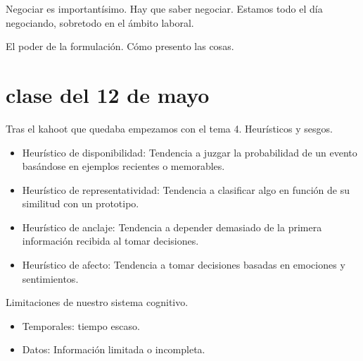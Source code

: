 \documentclass[12pt, a4paper, twoside]{article}
\begin{document}
Negociar es importantísimo. Hay que saber negociar.
Estamos todo el día negociando, sobretodo en el ámbito laboral.

El poder de la formulación. Cómo presento las cosas.

\section{clase del 12 de mayo}
Tras el kahoot que quedaba empezamos con el tema 4.
Heurísticos y sesgos.

\begin{itemize}
    \item{Heurístico de disponibilidad:} Tendencia a juzgar la probabilidad de un evento basándose en ejemplos recientes o memorables.
    \item{Heurístico de representatividad:} Tendencia a clasificar algo en función de su similitud con un prototipo.
    \item{Heurístico de anclaje:} Tendencia a depender demasiado de la primera información recibida al tomar decisiones.
    \item{Heurístico de afecto:} Tendencia a tomar decisiones basadas en emociones y sentimientos.
\end{itemize}

Limitaciones de nuestro sistema cognitivo.\\
\begin{itemize}
    \item Temporales: tiempo escaso.
    \item Datos: Información limitada o incompleta.
\end{itemize}
\end{document}

